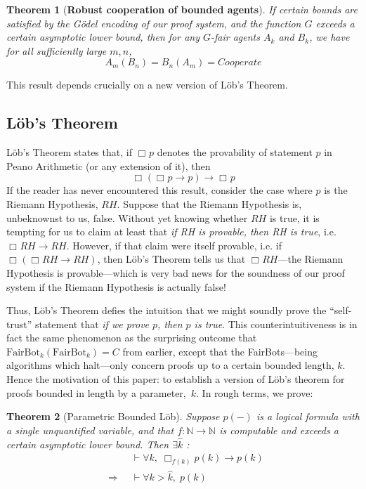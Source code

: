 \documentclass[onecolumn,authordate]{miri-tech-article}
\newtheorem*{theorem*}{Theorem}
\numberwithin{equation}{section}
\theoremstyle{definition}
\newcommand{\NN}{\mathbb{N}}
\newcommand{\proves}[1]{\underset{#1}{\vdash}}
\newcommand{\bx}[1]{\Box_{#1}}
\renewcommand{\implies}{\rightarrow}
\newcommand{\Implies}{\;\;\Rightarrow\;\;}
\renewcommand{\to}{\rightarrow}
\renewcommand{\-}{^{-1}}
\newcommand{\FB}{\mathrm{FairBot}}
\begin{document}
\begin{theorem*}[{\bf Robust cooperation of bounded agents}] If certain bounds are satisfied by the G\"{o}del encoding of our proof system, and the function $G$ exceeds a certain asymptotic lower bound, then for any $G$-fair agents $A_k$ and $B_k$, we have for all sufficiently large $m,n$,
$$A_m(B_n) = B_n(A_m) = Cooperate$$
\end{theorem*}

This result depends crucially on a new version of L\"{ob}'s Theorem.
 
\subsection{L\"{o}b's Theorem}

L\"{o}b's Theorem states that, if $\bx{}p$ denotes the provability of statement $p$ in Peano Arithmetic (or any extension of it), then 
$$\bx{}(\bx{}p \implies p) \implies \bx{}p$$
If the reader has never encountered this result, consider the case where $p$ is the Riemann Hypothesis, $RH$.  Suppose that the Riemann Hypothesis is, unbeknownst to us, false.  Without yet knowing whether $RH$ is true, it is tempting for us to claim at least that {\em if RH is provable, then RH is true}, i.e. $\bx{}RH \implies RH$.  However, if that claim were itself provable, i.e. if $\bx{}(\bx{}RH \implies RH)$, then L\"{o}b's Theorem tells us that $\bx{}RH$---the Riemann Hypothesis is provable---which is very bad news for the soundness of our proof system if the Riemann Hypothesis is actually false!

Thus, L\"{o}b's Theorem defies the intuition that we might soundly prove the ``self-trust'' statement that {\em if we prove $p$, then $p$ is true}.  This counterintuitiveness is in fact the same phenomenon as the surprising outcome that $\FB_k(\FB_k)=C$ from earlier, except that the FairBots---being algorithms which halt---only concern proofs up to a certain bounded length, $k$. Hence the motivation of this paper: to establish a version of L\"{o}b's theorem for proofs bounded in length by a parameter,~$k$.  In rough terms, we prove:
\begin{theorem*}[Parametric Bounded L\"{o}b]
Suppose $p(-)$ is a logical formula with a single unquantified variable, and that $f:\NN \to \NN$ is computable and  exceeds a certain asymptotic lower bound.  Then $\exists\hat k$ :
\begin{align*}
             &\proves{} \forall k,\; \bx{f(k)}p(k) \implies p(k)\\
\Implies &\proves{} \forall k>\hat k, \; p(k)
\end{align*}
\end{theorem*}
\end{document}

